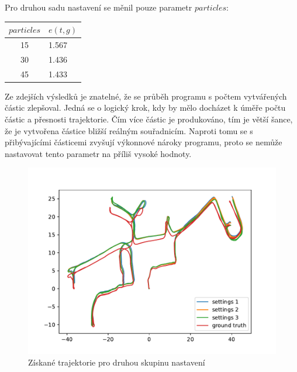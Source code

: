 \documentclass[12pt]{report}
\begin{document}
\noindent Pro druhou sadu nastavení se měnil pouze parametr $particles$:
\begin{center}
	\begin{tabular}{c|p{1.5cm}}
		\bfseries $particles$  & $e(t,g)$ \\ [2mm]
		\hline
		15 & 1.567\\
		30 & 1.436 \\ 
		45 & 1.433 \\
	\end{tabular}
\end{center}
Ze zdejších výsledků je znatelné, že se průběh programu s počtem vytvářených částic zlepšoval. Jedná se o logický krok, kdy by mělo docházet k úměře počtu částic a přesnosti trajektorie. Čím více částic je produkováno, tím je větší šance, že je vytvořena částice bližší reálným souřadnicím. Naproti tomu se s přibývajícími částicemi zvyšují výkonnové nároky programu, proto se nemůže nastavovat tento parametr na příliš vysoké hodnoty.\\
\begin{figure}[!ht]
	\begin{center}
		\includegraphics[width=0.67\columnwidth]{imgs/gmapping2.pdf}
	\end{center}
	\caption{Získané trajektorie pro druhou skupinu nastavení}
	\label{fig:gmapping2}
\end{figure}
\end{document}
